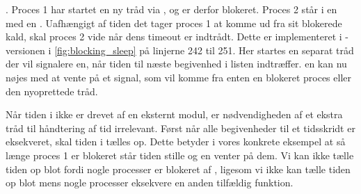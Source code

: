 . Proces 1 har startet en ny tråd via , og er derfor blokeret. Proces 2 står i en  med en . Uafhængigt af tiden det tager proces 1 at komme ud fra sit blokerede kald, skal proces 2 vide når dens timeout er indtrådt. Dette er implementeret i -versionen i \cref{fig:blocking_sleep} på linjerne 242 til 251. Her startes en separat tråd der vil signalere \sched en, når tiden til næste begivenhed i  listen indtræffer. \Sched en kan nu nøjes med at vente på et signal, som vil komme fra enten en blokeret proces eller den nyoprettede tråd.

Når tiden i \des ikke er drevet af en eksternt modul, er nødvendigheden af et ekstra tråd til  håndtering af tid irrelevant. Først når alle begivenheder til et tidsskridt er eksekveret, skal tiden i \des tælles op. Dette betyder i vores konkrete eksempel at  så længe   proces 1 er blokeret står tiden stille og  \sched en venter på dem. Vi kan ikke tælle tiden op blot fordi nogle processer er blokeret af , ligesom vi ikke kan tælle tiden op blot mens nogle processer eksekvere en anden tilfældig funktion.

